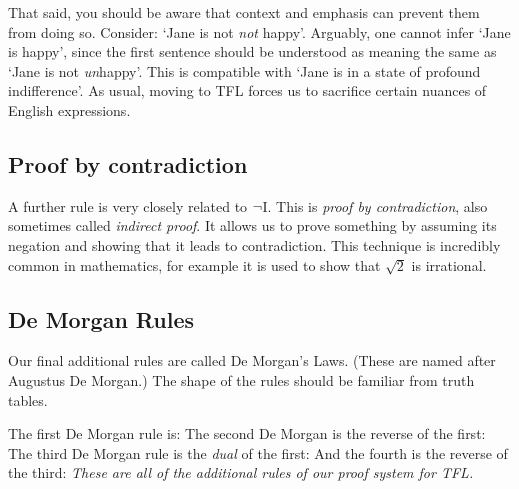 That said, you should be aware that context and emphasis can prevent them from doing so. Consider: `Jane is not \emph{not} happy'. Arguably, one cannot infer `Jane is happy', since the first sentence should be understood as meaning the same as  `Jane is not \emph{un}happy'. This is compatible with `Jane is in a state of profound indifference'. As usual, moving to TFL forces us to sacrifice certain nuances of English expressions.

\subsection{Proof by contradiction}
A further rule is very closely related to $\neg$I. This is \emph{proof by contradiction}, also sometimes called \emph{indirect proof}. It allows us to prove something by assuming its negation and showing that it leads to contradiction. This technique is incredibly common in mathematics, for example it is used to show that $\sqrt{2}$ is irrational. 


\subsection{De Morgan Rules}
Our final additional rules are called De Morgan's Laws. (These are named after Augustus De Morgan.) The shape of the rules should be familiar from truth tables.

The first De Morgan rule is:
The second De Morgan is the reverse of the first:
The third De Morgan rule is the \emph{dual} of the first:
And the fourth is the reverse of the third:
\emph{These are all of the additional rules of our proof system for TFL.}

